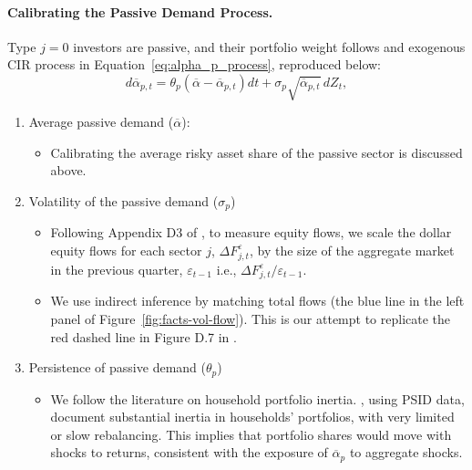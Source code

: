 \paragraph{Calibrating the Passive Demand Process.}
Type $j=0$ investors are passive, and their portfolio weight follows and exogenous CIR process in Equation~\eqref{eq:alpha_p_process}, reproduced below:
\begin{equation*}
    d \overline{\alpha}_{p,t} = \theta_p (\overline{\alpha} - \overline{\alpha}_{p,t}) dt + \sigma_{p} \sqrt{\overline{\alpha}_{p,t}}\, d Z_t,
\end{equation*}
\begin{enumerate}
    \item Average passive demand ($\overline{\alpha}$): 
    \begin{itemize}
        \item Calibrating the average risky asset share of the passive sector is discussed above.
    \end{itemize}
    \item Volatility of the passive demand ($\sigma_p$)
    \begin{itemize}
        \item Following Appendix D3 of \cite{gabaix2020search}, to measure equity flows, we scale the dollar equity flows for each sector $j$, $\Delta F_{j,t}^\varepsilon$, by the size of the aggregate market in the previous quarter, $\varepsilon_{t-1}$ i.e., $\Delta F_{j,t}^\varepsilon/\varepsilon_{t-1} $.  
        \item We use indirect inference by matching total flows (the blue line in the left panel of Figure~\ref{fig:facts-vol-flow}). This is our attempt to replicate the red dashed line in Figure D.7 in \cite{gabaix2020search}.
    \end{itemize}
    \item Persistence of passive demand ($\theta_p$)
    \begin{itemize}
        \item We follow the literature on household portfolio inertia. \cite{brunnermeier2008wealth}, using PSID data, document substantial inertia in households’ portfolios, with very limited or slow rebalancing. This implies that portfolio shares would move with shocks to returns, consistent with the exposure of $\overline{\alpha}_p$ to aggregate shocks. 

\end{itemize}
\end{enumerate}
